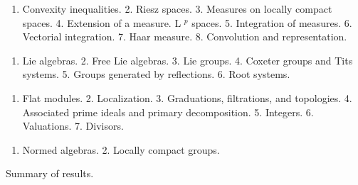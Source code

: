 
\begin{enumerate}
\def\labelenumi{\arabic{enumi}.}
\tightlist
\item
  Convexity inequalities. 2. Riesz spaces. 3. Measures on locally compact spaces. 4. Extension of a measure. L \(^{p}\) spaces. 5. Integration of measures. 6. Vectorial integration. 7. Haar measure. 8. Convolution and representation.
\end{enumerate}


\begin{enumerate}
\def\labelenumi{\arabic{enumi}.}
\tightlist
\item
  Lie algebras. 2. Free Lie algebras. 3. Lie groups. 4. Coxeter groups and Tits systems. 5. Groups generated by reflections. 6. Root systems.
\end{enumerate}


\begin{enumerate}
\def\labelenumi{\arabic{enumi}.}
\tightlist
\item
  Flat modules. 2. Localization. 3. Graduations, filtrations, and topologies. 4. Associated prime ideals and primary decomposition. 5. Integers. 6. Valuations. 7. Divisors.
\end{enumerate}


\begin{enumerate}
\def\labelenumi{\arabic{enumi}.}
\tightlist
\item
  Normed algebras. 2. Locally compact groups.
\end{enumerate}


Summary of results.

